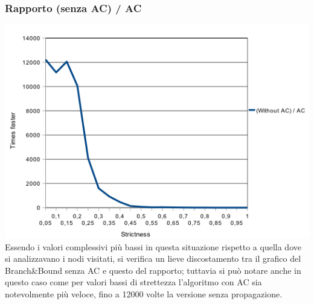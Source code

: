 \documentclass[a4paper,12pt,italian]{article}
\begin{document}
\subsubsection{Rapporto (senza AC) / AC}
\includegraphics[scale=0.8]{strictTimeQuotient.png}
\\
Essendo i valori complessivi pi\`u bassi in questa situazione rispetto a quella dove si analizzavano
i nodi visitati, si verifica un lieve discostamento tra il grafico del Branch\&Bound senza AC e questo del rapporto; tuttavia
si pu\`o notare anche in questo caso come per valori bassi di strettezza l'algoritmo con AC sia notevolmente pi\`u
veloce, fino a 12000 volte la versione senza propagazione.
\end{document}
